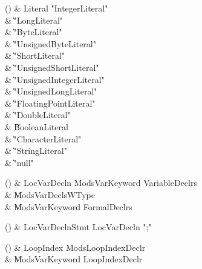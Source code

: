 \begin{bbgrammarappendix}{4.3in}

() & Literal \label{prod:Literal}  \: \xcd"IntegerLiteral"   \\

 &    \| \xcd"LongLiteral"  \\
 &    \| \xcd"ByteLiteral" \\
 &    \| \xcd"UnsignedByteLiteral" \\
 &    \| \xcd"ShortLiteral" \\
 &    \| \xcd"UnsignedShortLiteral" \\
 &    \| \xcd"UnsignedIntegerLiteral"  \\
 &    \| \xcd"UnsignedLongLiteral"  \\
 &    \| \xcd"FloatingPointLiteral"  \\
 &    \| \xcd"DoubleLiteral"  \\
 &    \| BooleanLiteral \\
 &    \| \xcd"CharacterLiteral"  \\
 &    \| \xcd"StringLiteral"  \\
 &    \| \xcd"null" \\

\end{bbgrammarappendix}

\begin{bbgrammarappendix}{3.9in}

() & LocVarDecln \label{prod:LocVarDecln}  \: Mods\opt VarKeyword VariableDeclrs  \\

 &    \| Mods\opt VarDeclsWType \\
 &    \| Mods\opt VarKeyword FormalDeclrs \\

\end{bbgrammarappendix}

\begin{bbgrammarappendix}{3.5in}

() & LocVarDeclnStmt \label{prod:LocVarDeclnStmt}  \: LocVarDecln \xcd";"  \\


\end{bbgrammarappendix}

\begin{bbgrammarappendix}{4.1in}

() & LoopIndex \label{prod:LoopIndex}  \: Mods\opt LoopIndexDeclr  \\

 &    \| Mods\opt VarKeyword LoopIndexDeclr \\

\end{bbgrammarappendix}

